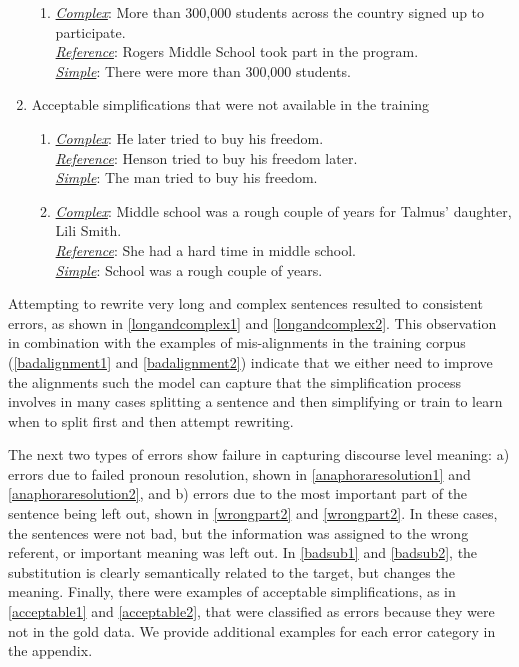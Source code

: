 \documentclass[thesis.tex]{subfiles}
\begin{document}
\begin{enumerate}
\begin{enumerate}
\item{\label{badalignment2}} \underline{\it Complex}: More than 300,000 students across the country signed up to participate. \\
\underline{\it Reference}: Rogers Middle School took part in the program.\\
\underline{\it Simple}: There were more than 300,000 students.
\end{enumerate}

\item{Acceptable simplifications that were not available in the training}
\begin{enumerate}
\small
\item{\label{acceptable1}} \underline{\it Complex}: He later tried to buy his freedom.\\
\underline{\it Reference}: Henson tried to buy his freedom later. \\
\underline{\it Simple}: The man tried to buy his freedom.

\item{\label{acceptable2}} \underline{\it Complex}: Middle school was a rough couple of years for Talmus' daughter, Lili Smith. \\
\underline{\it Reference}: She had a hard time in middle school.\\
\underline{\it Simple}: School was a rough couple of years.
\end{enumerate}
\end{enumerate}

Attempting to rewrite very long and complex sentences resulted to consistent errors, as shown in \ref{longandcomplex1} and \ref{longandcomplex2}. This observation in combination with the examples of mis-alignments in the training corpus (\ref{badalignment1} and \ref{badalignment2}) indicate that we either need to improve the alignments such the model can capture that the simplification process involves in many cases splitting a sentence and then simplifying or train to learn when to split first and then attempt rewriting. 

The next two types of errors show failure in capturing discourse level meaning: a) errors due to failed pronoun resolution, shown in \ref{anaphoraresolution1} and \ref{anaphoraresolution2}, and b) errors due to the most important part of the sentence being left out, shown in \ref{wrongpart2} and \ref{wrongpart2}. In these cases, the sentences were not bad, but the information was assigned to the wrong referent, or important meaning was left out. In \ref{badsub1} and \ref{badsub2}, the substitution is clearly semantically related to the target, but changes the meaning. Finally, there were examples of acceptable simplifications, as in \ref{acceptable1} and \ref{acceptable2}, that were classified as errors because they were not in the gold data. We provide additional examples for each error category in the appendix.
\end{document}
